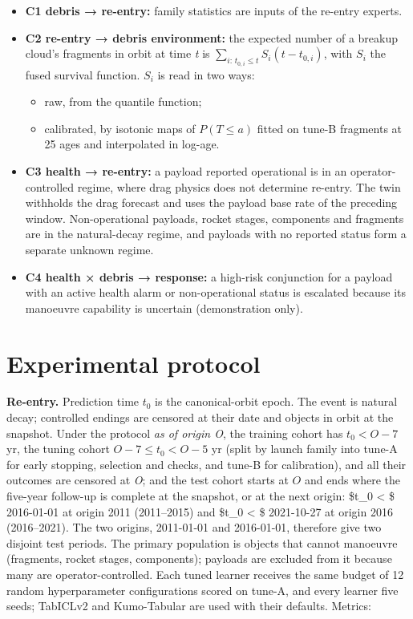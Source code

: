 \documentclass[
]{article}
\providecommand{\tightlist}{%
  \setlength{\itemsep}{0pt}\setlength{\parskip}{0pt}}
\begin{document}
\begin{itemize}
\tightlist
\item
  \textbf{C1 debris → re-entry:} family statistics are inputs of the
  re-entry experts.
\item
  \textbf{C2 re-entry → debris environment:} the expected number of a
  breakup cloud's fragments in orbit at time \emph{t} is
  \(\sum_{i:\,t_{0,i}\le t} S_i(t - t_{0,i})\), with \(S_i\) the fused
  survival function. \(S_i\) is read in two ways:

  \begin{itemize}
  \tightlist
  \item
    raw, from the quantile function;
  \item
    calibrated, by isotonic maps of \(P(T \le a)\) fitted on tune-B
    fragments at 25 ages and interpolated in log-age.
  \end{itemize}
\item
  \textbf{C3 health → re-entry:} a payload reported operational is in an
  operator-controlled regime, where drag physics does not determine
  re-entry. The twin withholds the drag forecast and uses the payload
  base rate of the preceding window. Non-operational payloads, rocket
  stages, components and fragments are in the natural-decay regime, and
  payloads with no reported status form a separate unknown regime.
\item
  \textbf{C4 health × debris → response:} a high-risk conjunction for a
  payload with an active health alarm or non-operational status is
  escalated because its manoeuvre capability is uncertain (demonstration
  only).
\end{itemize}

\section{Experimental protocol}\label{sec:protocol}

\textbf{Re-entry.} Prediction time \(t_0\) is the canonical-orbit epoch.
The event is natural decay; controlled endings are censored at their
date and objects in orbit at the snapshot. Under the protocol \emph{as
of origin O}, the training cohort has \(t_0 < O - 7\) yr, the tuning
cohort \(O - 7 \le t_0 < O - 5\) yr (split by launch family into tune-A
for early stopping, selection and checks, and tune-B for calibration),
and all their outcomes are censored at \emph{O}; and the test cohort
starts at \(O\) and ends where the five-year follow-up is complete at
the snapshot, or at the next origin: \$t\_0 \textless{} \$ 2016-01-01 at
origin 2011 (2011--2015) and \$t\_0 \textless{} \$ 2021-10-27 at origin
2016 (2016--2021). The two origins, 2011-01-01 and 2016-01-01, therefore
give two disjoint test periods. The primary population is objects that
cannot manoeuvre (fragments, rocket stages, components); payloads are
excluded from it because many are operator-controlled. Each tuned
learner receives the same budget of 12 random hyperparameter
configurations scored on tune-A, and every learner five seeds; TabICLv2
and Kumo-Tabular are used with their defaults. Metrics:
\end{document}
